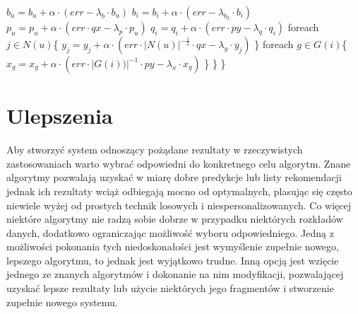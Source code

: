 \documentclass{pracamgr}
\begin{document}
    \hspace*{48pt}			$b_u=b_u+\alpha\cdot(err-\lambda_b\cdot b_u)$\newline
    \hspace*{48pt}			$b_i=b_i+\alpha\cdot(err-\lambda_{b_2}\cdot b_i)$\newline
    \hspace*{48pt}			$p_u=p_u+\alpha\cdot(err\cdot qx-\lambda_p\cdot p_u)$\newline
    \hspace*{48pt}			$q_i=q_i+\alpha\cdot(err\cdot py-\lambda_q\cdot q_i)$\newline
    \hspace*{48pt}			foreach $j\in N(u)$\{\newline
    \hspace*{64pt}				$y_j=y_j+\alpha\cdot(err\cdot |N(u)|^{-\frac{1}{2}}\cdot qx-\lambda_y\cdot y_j)$\newline
    \hspace*{48pt}			\}\newline
    \hspace*{48pt}			foreach $g\in G(i)$\{\newline
    \hspace*{64pt}				$x_g=x_g+\alpha\cdot(err\cdot |G(i))|^{-1}\cdot py-\lambda_x\cdot x_g)$\newline
    \hspace*{48pt}			\}\newline
    \hspace*{32pt}		\}\newline
    \hspace*{16pt}	\}\newline
 \chapter{Ulepszenia}
  Aby stworzyć system odnoszący pożądane rezultaty w rzeczywistych zastosowaniach warto wybrać odpowiedni do konkretnego celu algorytm.
  Znane algorytmy pozwalają uzyskać w miarę dobre predykcje lub listy rekomendacji jednak ich rezultaty wciąż odbiegają mocno od optymalnych,
  plasując się często niewiele wyżej od prostych technik losowych i niespersonalizowanych.
  Co więcej niektóre algorytmy nie radzą sobie dobrze w przypadku niektórych rozkładów danych, dodatkowo ograniczając możliwość wyboru odpowiedniego.
  Jedną z możliwości pokonania tych niedoskonałości jest wymyślenie zupełnie nowego, lepszego algorytmu, to jednak jest wyjątkowo trudne.
  Inną opcją jest wzięcie jednego ze znanych algorytmów i dokonanie na nim modyfikacji, pozwalającej uzyskać lepsze rezultaty
  lub użycie niektórych jego fragmentów i stworzenie zupełnie nowego systemu.
 
\end{document}
